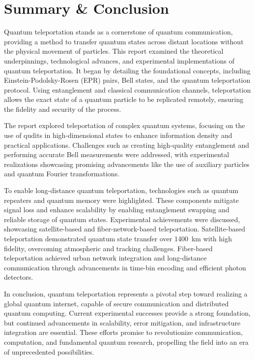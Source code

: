 \section{Summary \& Conclusion}
Quantum teleportation stands as a cornerstone of quantum communication, providing a method to transfer quantum states across distant locations without the physical movement of particles. This report examined the theoretical underpinnings, technological advances, and experimental implementations of quantum teleportation. It began by detailing the foundational concepts, including Einstein-Podolsky-Rosen (EPR) pairs, Bell states, and the quantum teleportation protocol. Using entanglement and classical communication channels, teleportation allows the exact state of a quantum particle to be replicated remotely, ensuring the fidelity and security of the process.

The report explored teleportation of complex quantum systems, focusing on the use of qudits in high-dimensional states to enhance information density and practical applications. Challenges such as creating high-quality entanglement and performing accurate Bell measurements were addressed, with experimental realizations showcasing promising advancements like the use of auxiliary particles and quantum Fourier transformations.

To enable long-distance quantum teleportation, technologies such as quantum repeaters and quantum memory were highlighted. These components mitigate signal loss and enhance scalability by enabling entanglement swapping and reliable storage of quantum states. Experimental achievements were discussed, showcasing satellite-based and fiber-network-based teleportation. Satellite-based teleportation demonstrated quantum state transfer over \SI{1400}{\kilo\meter} with high fidelity, overcoming atmospheric and tracking challenges. Fiber-based teleportation achieved urban network integration and long-distance communication through advancements in time-bin encoding and efficient photon detectors.

In conclusion, quantum teleportation represents a pivotal step toward realizing a global quantum internet, capable of secure communication and distributed quantum computing. Current experimental successes provide a strong foundation, but continued advancements in scalability, error mitigation, and infrastructure integration are essential. These efforts promise to revolutionize communication, computation, and fundamental quantum research, propelling the field into an era of unprecedented possibilities.

